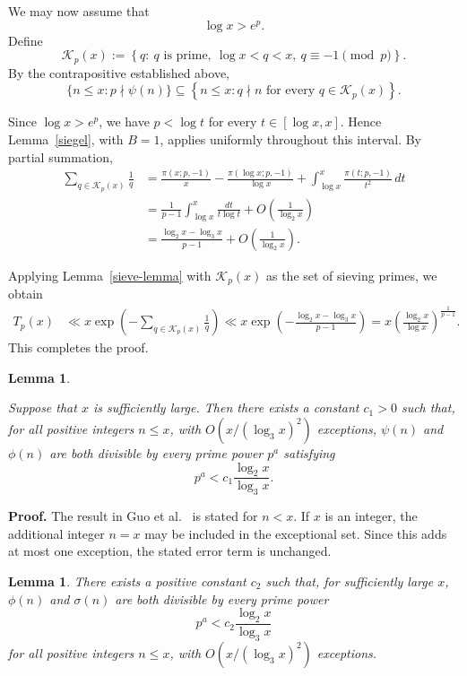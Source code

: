 \documentclass{article}
\newtheorem{lemma}[theorem]{Lemma}
\theoremstyle{remark}
\begin{document}
We may now assume that
\[
\log x>e^p.
\]
Define
\[
\mathcal K_p(x)
:=
\left\{
q:\ q\text{ is prime},\
\log x<q<x,\
q\equiv-1\pmod p
\right\}.
\]
By the contrapositive established above,
\[
\{n\le x:p\nmid\psi(n)\}
\subseteq
\left\{
n\le x:
q\nmid n\text{ for every }q\in\mathcal K_p(x)
\right\}.
\]

Since \(\log x>e^p\), we have \(p<\log t\) for every
\(t\in[\log x,x]\). Hence Lemma~\ref{siegel}, with \(B=1\),
applies uniformly throughout this interval. By partial summation,
\[
\begin{aligned}
\sum_{q\in\mathcal K_p(x)}\frac1q
&=
\frac{\pi(x;p,-1)}x
-
\frac{\pi(\log x;p,-1)}{\log x}
+
\int_{\log x}^x
\frac{\pi(t;p,-1)}{t^2}\,dt\\
&=
\frac1{p-1}
\int_{\log x}^x\frac{dt}{t\log t}
+
O\left(\frac1{\log_2x}\right)\\
&=
\frac{\log_2x-\log_3x}{p-1}
+
O\left(\frac1{\log_2x}\right).
\end{aligned}
\]

Applying Lemma~\ref{sieve-lemma} with
\(\mathcal K_p(x)\) as the set of sieving primes, we obtain
\[
\begin{aligned}
T_p(x)
&\ll
x\exp\left(
-\sum_{q\in\mathcal K_p(x)}\frac1q
\right)\ll
x\exp\left(
-\frac{\log_2x-\log_3x}{p-1}
\right)=
x\left(
\frac{\log_2x}{\log x}
\right)^{\frac1{p-1}}.
\end{aligned}
\]
This completes the proof.

\begin{lemma}\label{div-lemma}

 Suppose that \(x\) is sufficiently large. Then there exists
a constant \(c_1>0\) such that, for all positive integers \(n\le x\),
with \(O(x/(\log_3 x)^2)\) exceptions, \(\psi(n)\) and \(\phi(n)\) are both divisible by every prime power \(p^a\) satisfying
\[
p^a<c_1\frac{\log_2 x}{\log_3 x}.
\]
\end{lemma}

\textbf{Proof.} The result in Guo et al.~\cite{Guo} is stated for \(n<x\).
If \(x\) is an integer, the additional integer \(n=x\) may be included
in the exceptional set. Since this adds at most one exception, the
stated error term is unchanged.

\begin{lemma}\label{div-lemma1}
 There exists a positive constant \(c_2\) such that, for
sufficiently large \(x\), \(\phi(n)\) and \(\sigma(n)\) are both
divisible by every prime power
\[
p^a<c_2\frac{\log_2 x}{\log_3 x}
\]
for all positive integers \(n\le x\), with
\(O(x/(\log_3 x)^2)\) exceptions.

\end{lemma}
\end{document}
